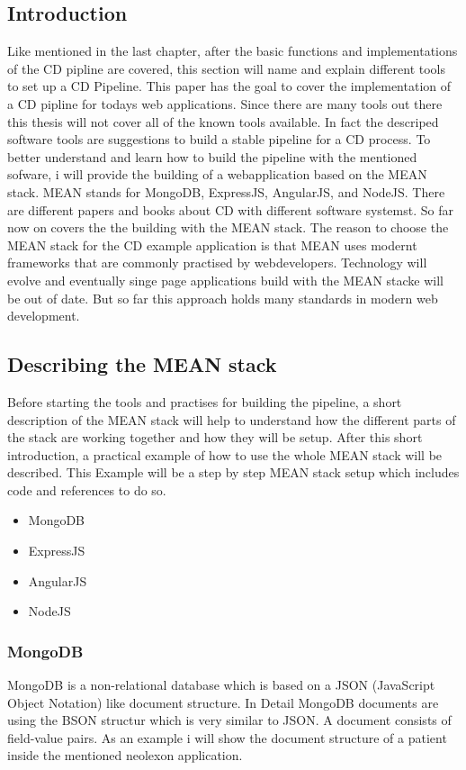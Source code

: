 \subsection{Introduction}
Like mentioned in the last chapter, after the basic functions and implementations of the CD pipline are covered, this section will name and explain different tools
to set up a CD Pipeline. This paper has the goal to cover the implementation of a CD pipline for todays web applications. Since there are many tools out there
this thesis will not cover all of the known tools available. In fact the descriped software tools are suggestions to build a stable pipeline for a CD process.
To better understand and learn how to build the pipeline with the mentioned sofware, i will provide the building of a webapplication based on the
MEAN stack. MEAN stands for MongoDB, ExpressJS, AngularJS, and NodeJS. There are different papers and books about CD with different software systemst. So far
now on covers the the building with the MEAN stack.
The reason to choose the MEAN stack for the CD example application is that MEAN uses modernt frameworks that are commonly practised by webdevelopers. Technology
will evolve and eventually singe page applications build with the MEAN stacke will be out of date. But so far this approach holds many standards in modern web
development.

\subsection{Describing the MEAN stack}
Before starting the tools and practises for building the pipeline, a short description of the MEAN stack will help to understand how the different parts of the
stack are working together and how they will be setup. After this short introduction, a practical example of how to use the whole MEAN stack will be described.
This Example will be a step by step MEAN stack setup which includes code and references to do so.

\begin{itemize}
  \item MongoDB
  \item ExpressJS
  \item AngularJS
  \item NodeJS
\end{itemize}

\subsubsection{MongoDB}
MongoDB is a non-relational database which is based on a JSON (JavaScript Object Notation) like document structure. In Detail MongoDB documents are using the BSON structur
which is very similar to JSON. A document consists of field-value pairs. As an example i will show the document structure of a patient inside the mentioned neolexon application.

